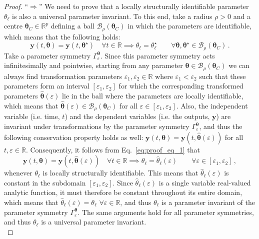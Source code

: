 \documentclass[12pt]{article}
\begin{document}
\begin{proof}
  ``$\Longrightarrow$'' We need to prove that a locally structurally identifiable parameter $\theta_{\ell}$ is also a universal parameter invariant. To this end, take a radius $\rho>0$ and a centre $\boldsymbol{\theta}_{C}\in\mathbb{R}^{p}$ defining a ball $\mathcal{B}_{\rho}\left(\boldsymbol{\theta}_{C}\right)$ in which the parameters are identifiable, which means that the following holds:
  \begin{equation}
  \mathbf{y}(t,\boldsymbol{\theta})=\mathbf{y}(t,\boldsymbol{\theta}^{\star})\quad\forall{t}\in\mathbb{R}\implies{\theta}_{\ell}=\theta_{\ell}^{\star}\quad\quad\forall\boldsymbol{\theta},\boldsymbol{\theta}^{\star}\in\mathcal{B}_{\rho}\left(\boldsymbol{\theta}_{C}\right)\,.
      \label{eq:proof_eq_1}
  \end{equation}
  Take a parameter symmetry $\Gamma_{\varepsilon}^{\boldsymbol{\theta}}$. Since this parameter symmetry acts infinitesimally and pointwise, starting from any parameter $\boldsymbol{\theta}\in\mathcal{B}_{\rho}(\boldsymbol{\theta}_{C})$ we can always find transformation parameters $\varepsilon_{1},\varepsilon_{2}\in\mathbb{R}$ where $\varepsilon_{1}<\varepsilon_{2}$ such that these parameters form an interval $[\varepsilon_{1},\varepsilon_{2}]$ for which the corresponding transformed parameters $\hat{\boldsymbol{\theta}}(\varepsilon)$ lie in the ball where the parameters are locally identifiable, which means that $\hat{\boldsymbol{\theta}}(\varepsilon)\in\mathcal{B}_{\rho}\left(\boldsymbol{\theta}_{C}\right)$ for all $\varepsilon\in[\varepsilon_{1},\varepsilon_{2}]$. Also, the independent variable (i.e. time, $t$) and the dependent variables (i.e. the outputs, $\mathbf{y}$) are invariant under transformations by the parameter symmetry $\Gamma_{\varepsilon}^{\boldsymbol{\theta}}$, and thus the following conservation property holds as well: $\mathbf{y}(t,\boldsymbol{\theta})=\mathbf{y}(t,\hat{\boldsymbol{\theta}}(\varepsilon))$ for all ${t,\varepsilon}\in\mathbb{R}$.
  Consequently, it follows from Eq.~\eqref{eq:proof_eq_1} that
  $$ \mathbf{y}(t,\boldsymbol{\theta})=\mathbf{y}(t,\hat{\boldsymbol{\theta}}(\varepsilon))\quad\forall{t}\in\mathbb{R}\implies{\theta}_{\ell}=\hat{\theta}_{\ell}(\varepsilon)\quad\quad\forall\varepsilon\in[\varepsilon_{1},\varepsilon_{2}]\,,$$
  whenever $\theta_{\ell}$ is locally structurally identifiable. This means that $\hat{\theta}_{\ell}(\varepsilon)$ is constant in the subdomain $[\varepsilon_{1},\varepsilon_{2}]$. Since $\hat{\theta}_{\ell}(\varepsilon)$ is a single variable real-valued analytic function, it must therefore be constant throughout its entire domain, which means that $\hat{\theta}_{\ell}(\varepsilon)={\theta}_{\ell}\,\,\forall\varepsilon\in\mathbb{R}$, and thus $\theta_{\ell}$ is a parameter invariant of the parameter symmetry $\Gamma_{\varepsilon}^{\boldsymbol{\theta}}$. The same arguments hold for all parameter symmetries, and thus $\theta_{\ell}$ is a universal parameter invariant. \medskip \\

\end{proof}
\end{document}
